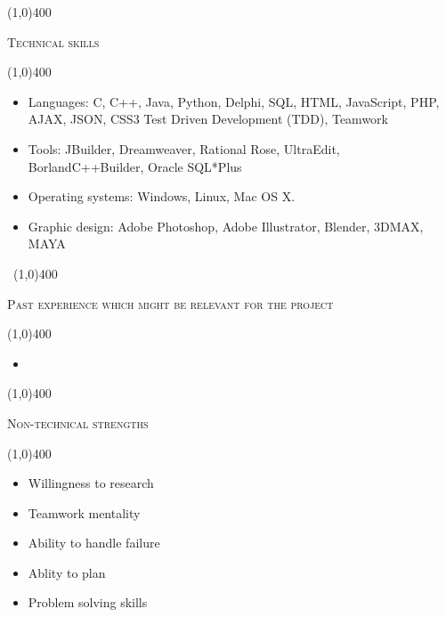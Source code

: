 \documentclass[12pt,a4paper]{report}
\begin{document}
	\begin{center}
	
	\line(1,0){400}\\
	{\scshape\large Technical skills\par}
	\line(1,0){400}\\
	\end{center}
		\begin{itemize}
\item Languages:   C, C++, Java, Python, Delphi, SQL, HTML, JavaScript, PHP, AJAX, JSON, CSS3
Test Driven Development (TDD), Teamwork
\item Tools:  JBuilder, Dreamweaver, Rational Rose, UltraEdit, BorlandC++Builder, Oracle SQL*Plus
\item  Operating systems:   Windows, Linux, Mac OS X.
\item Graphic design:  Adobe Photoshop, Adobe Illustrator, Blender, 3DMAX, MAYA
\end{itemize}
\newpage
\begin{center}
	\vspace*{-3cm}\
	\line(1,0){400}\\
	{\scshape\large Past experience which might be relevant for the project\par}
	\line(1,0){400}\\
	\end{center}
		\begin{itemize}
\item 

\end{itemize}

	\begin{center}
	
	\line(1,0){400}\\
	{\scshape\large Non-technical strengths\par}
	\line(1,0){400}\\
	\end{center}
		\begin{itemize}
\item Willingness to research
\item Teamwork mentality
\item Ability to handle failure
\item Ablity to plan
\item Problem solving skills
\end{itemize}
\end{document}
